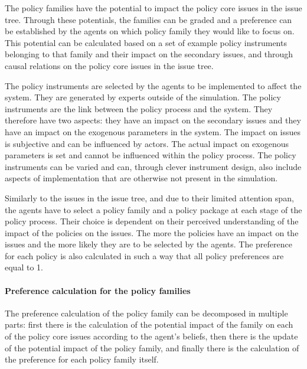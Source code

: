 \documentclass[11pt]{article}
\begin{document}
The policy families have the potential to impact the policy core issues in the issue tree. Through these potentials, the families can be graded and a preference can be established by the agents on which policy family they would like to focus on. This potential can be calculated based on a set of example policy instruments belonging to that family and their impact on the secondary issues, and through causal relations on the policy core issues in the issue tree.

The policy instruments are selected by the agents to be implemented to affect the system. They are generated by experts outside of the simulation. The policy instruments are the link between the policy process and the system. They therefore have two aspects: they have an impact on the secondary issues and they have an impact on the exogenous parameters in the system. The impact on issues is subjective and can be influenced by actors. The actual impact on exogenous parameters is set and cannot be influenced within the policy process. The policy instruments can be varied and can, through clever instrument design, also include aspects of implementation that are otherwise not present in the simulation.

Similarly to the issues in the issue tree, and due to their limited attention span, the agents have to select a policy family and a policy package at each stage of the policy process. Their choice is dependent on their perceived understanding of the impact of the policies on the issues. The more the policies have an impact on the issues and the more likely they are to be selected by the agents. The preference for each policy is also calculated in such a way that all policy preferences are equal to 1.


\paragraph{Preference calculation for the policy families}
\label{sssec:prefCalcPolicyFamilies}

The preference calculation of the policy family can be decomposed in multiple parts: first there is the calculation of the potential impact of the family on each of the policy core issues according to the agent's beliefs, then there is the update of the potential impact of the policy family, and finally there is the calculation of the preference for each policy family itself.
\end{document}
